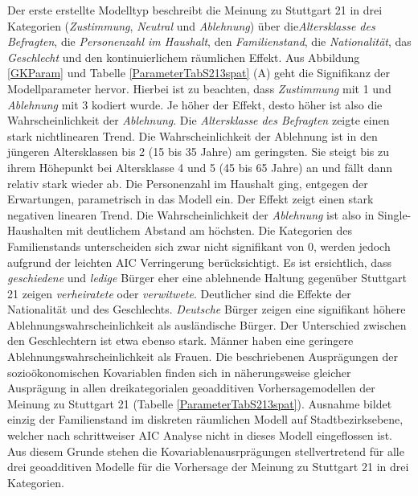 \documentclass{Vorlage}
\begin{document}
Der erste erstellte Modelltyp beschreibt die Meinung zu Stuttgart 21 in drei Kategorien (\textit{Zustimmung}, \textit{Neutral} und \textit{Ablehnung}) über die\textit{Altersklasse des Befragten}, die \textit{Personenzahl im Haushalt}, den \textit{Familienstand}, die \textit{Nationalität}, das \textit{Geschlecht} und den kontinuierlichem räumlichen Effekt. Aus Abbildung \ref{GKParam} und Tabelle \ref{ParameterTabS213spat} (A) geht die Signifikanz der Modellparameter hervor. Hierbei ist zu beachten, dass \textit{Zustimmung} mit 1 und \textit{Ablehnung} mit 3 kodiert wurde. Je höher der Effekt, desto höher ist also die Wahrscheinlichkeit der \textit{Ablehnung}. Die \textit{Altersklasse des Befragten} zeigte einen stark nichtlinearen Trend. Die Wahrscheinlichkeit der Ablehnung ist in den jüngeren Altersklassen bis 2 (15 bis 35 Jahre) am geringsten. Sie steigt bis zu ihrem Höhepunkt bei Altersklasse  4 und 5 (45 bis 65 Jahre) an und fällt dann relativ stark wieder ab. Die Personenzahl im Haushalt ging, entgegen der Erwartungen, parametrisch in das Modell ein. Der Effekt zeigt einen stark negativen linearen Trend. Die Wahrscheinlichkeit der \textit{Ablehnung} ist also in Single-Haushalten mit deutlichem Abstand am höchsten. Die Kategorien des Familienstands unterscheiden sich zwar nicht signifikant von 0, werden jedoch aufgrund der leichten AIC Verringerung berücksichtigt. Es ist ersichtlich, dass \textit{geschiedene} und \textit{ledige} Bürger eher eine ablehnende Haltung gegenüber Stuttgart 21 zeigen \textit{verheiratete} oder \textit{verwitwete}. Deutlicher sind die Effekte der Nationalität und des Geschlechts. \textit{Deutsche} Bürger zeigen eine signifikant höhere Ablehnungswahrscheinlichkeit als ausländische Bürger. Der Unterschied zwischen den Geschlechtern ist etwa ebenso stark. Männer haben eine geringere Ablehnungswahrscheinlichkeit als Frauen. Die beschriebenen Ausprägungen der sozioökonomischen Kovariablen finden sich in näherungsweise gleicher Ausprägung in allen dreikategorialen geoadditiven Vorhersagemodellen der Meinung zu Stuttgart 21 (Tabelle \ref{ParameterTabS213spat}). Ausnahme bildet einzig der Familienstand im diskreten räumlichen Modell auf Stadtbezirksebene, welcher nach schrittweiser AIC Analyse nicht in dieses Modell eingeflossen ist. Aus diesem Grunde stehen die Kovariablenausrprägungen stellvertretend für alle drei geoadditiven Modelle für die Vorhersage der Meinung zu Stuttgart 21 in drei Kategorien.\\
\end{document}
